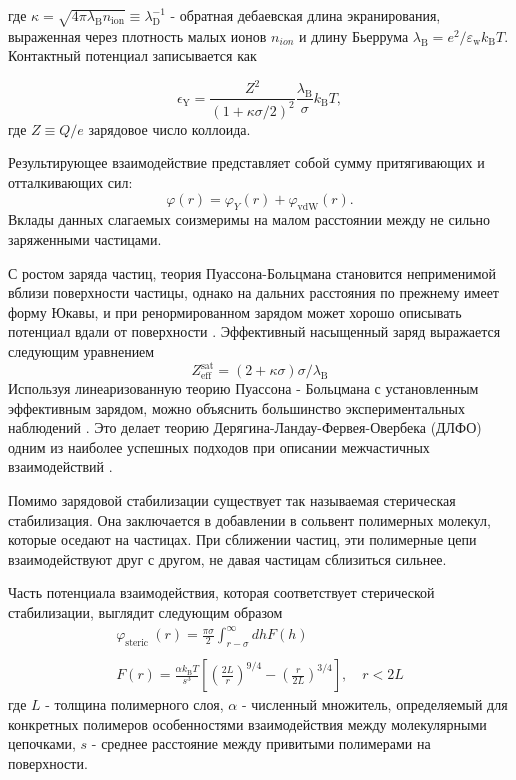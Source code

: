 где $\kappa=\sqrt{4 \pi \lambda_{\mathrm{B}} n_{\mathrm{ion}}} \equiv \lambda_{\mathrm{D}}^{-1}$ - обратная дебаевская длина экранирования, выраженная через плотность малых ионов $n_{ion}$ и длину Бьеррума $\lambda_{\mathrm{B}}=e^{2} / \varepsilon_{\mathrm{w}} k_{\mathrm{B}} T$. Контактный потенциал записывается как

\begin{equation}
\epsilon_{\mathrm{Y}}=\frac{Z^{2}}{(1+\kappa \sigma / 2)^{2}} \frac{\lambda_{\mathrm{B}}}{\sigma} k_{\mathrm{B}} T,
\end{equation}
где $Z \equiv Q / e$ зарядовое число коллоида.

Результирующее взаимодействие представляет собой сумму притягивающих и отталкивающих сил:
\begin{equation}
\varphi(r)=\varphi_{Y}(r)+\varphi_{\mathrm{vdW}}(r).
\end{equation}
Вклады данных слагаемых соизмеримы на малом расстоянии между не сильно заряженными частицами.

С ростом заряда частиц, теория Пуассона-Больцмана становится неприменимой вблизи поверхности частицы, однако на дальних расстояния по прежнему имеет форму Юкавы, и при ренормированном зарядом может хорошо описывать потенциал вдали от поверхности \cite{Yur55}. Эффективный насыщенный заряд выражается следующим уравнением \cite{Yur56}
\begin{equation}
Z_{\mathrm{eff}}^{\mathrm{sat}}=(2+\kappa \sigma) \sigma / \lambda_{\mathrm{B}}
\end{equation}
Используя линеаризованную теорию Пуассона - Больцмана с установленным эффективным зарядом, можно объяснить большинство экспериментальных наблюдений \cite{Yur57, Yur58, Yur59}. Это делает теорию Дерягина-Ландау-Фервея-Овербека (ДЛФО) одним из наиболее успешных подходов при описании межчастичных взаимодействий \cite{Yur49, Yur60, Yur61}.

Помимо зарядовой стабилизации существует так называемая стерическая стабилизация. Она заключается в добавлении в сольвент полимерных молекул, которые оседают на частицах. При сближении частиц, эти полимерные цепи взаимодействуют друг с другом, не давая частицам сблизиться сильнее.

Часть потенциала взаимодействия, которая соответствует стерической стабилизации, выглядит следующим образом \cite{Yur31}
\begin{equation}
\begin{array}{l}
\varphi_{\text {steric }}(r)=\frac{\pi \sigma}{2} \int_{r-\sigma}^{\infty} d h F(h) \\
\\
F(r)=\frac{\alpha k_{\mathrm{B}} T}{s^{3}}\left[\left(\frac{2 L}{r}\right)^{9 / 4}-\left(\frac{r}{2 L}\right)^{3 / 4}\right], \quad r<2 L
\end{array}
\label{eqStericStabl}
\end{equation}
где $L$ - толщина полимерного слоя, $\alpha$ - численный множитель, определяемый для конкретных полимеров
особенностями взаимодействия между молекулярными цепочками, $s$ - среднее расстояние между привитыми полимерами на поверхности.


